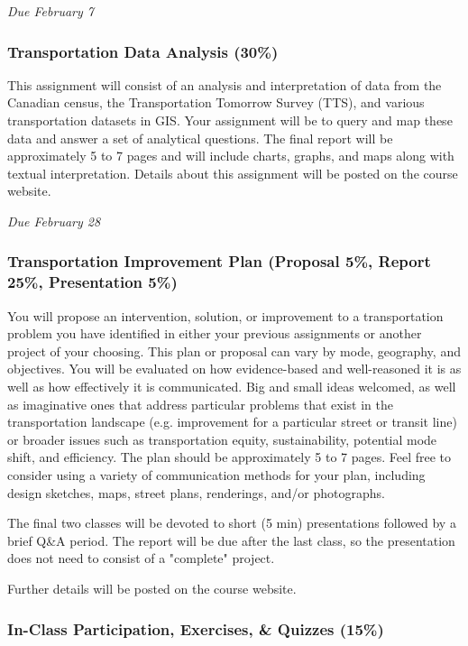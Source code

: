 \documentclass[11pt]{article}
\begin{document}
	\textit{Due February 7}
	
	
	
	
	\subsubsection*{Transportation Data Analysis (30\%)}
	
	This assignment will consist of an analysis and interpretation of data from the Canadian census, the Transportation Tomorrow Survey (TTS), and various transportation datasets in GIS. Your assignment will be to query and map these data and answer a set of analytical questions. The final report will be approximately 5 to 7 pages and will include charts, graphs, and maps along with textual interpretation. Details about this assignment will be posted on the course website.
	
	\textit{Due February 28}
	
	
	
	\subsubsection*{Transportation Improvement Plan (Proposal 5\%, Report 25\%, Presentation 5\%)}
	
	You will propose an intervention, solution, or
	improvement to a transportation problem you have identified in either your previous assignments or another project of your choosing. This plan or proposal can vary by mode, geography, and objectives. You will be evaluated on how evidence-based and well-reasoned it is as well as how effectively it is communicated. Big and small ideas welcomed, as well as imaginative ones that address particular problems that exist in the transportation landscape (e.g. improvement for a particular street or transit line) or broader issues such as transportation equity, sustainability, potential mode shift, and efficiency. The plan should be approximately 5 to 7 pages. Feel free to consider using a variety of communication methods for your plan, including design sketches, maps, street plans, renderings, and/or photographs.
	
	The final two classes will be devoted to short (5 min) presentations followed by a brief Q\&A period. The report will be due after the last class, so the presentation does not need to consist of a "complete" project.
	
	Further details will be posted on the course website.
	
	
	\subsubsection*{In-Class Participation, Exercises, \& Quizzes (15\%)}
	
\end{document}
